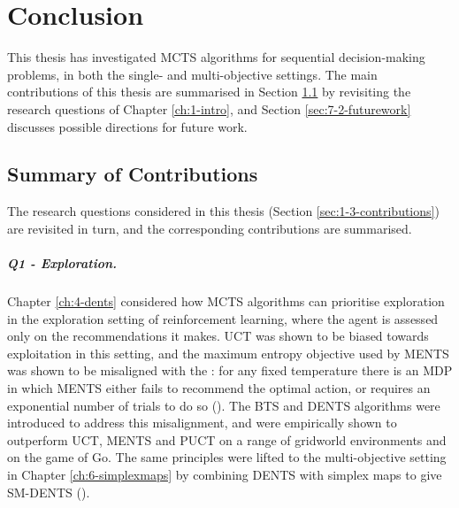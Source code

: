 

\chapter{\label{ch:7-conclusion}Conclusion} 

    \minitoc

    This thesis has investigated MCTS algorithms for sequential decision-making problems, in both the single- and multi-objective settings. The main contributions of this thesis are summarised in Section \ref{sec:7-1-contributions} by revisiting the research questions of Chapter \ref{ch:1-intro}, and Section \ref{sec:7-2-futurework} discusses possible directions for future work.



\section{Summary of Contributions}
\label{sec:7-1-contributions}

    The research questions considered in this thesis (Section \ref{sec:1-3-contributions}) are revisited in turn, and the corresponding contributions are summarised. 

    \paragraph{Q1 - Exploration.}
    Chapter \ref{ch:4-dents} considered how MCTS algorithms can prioritise exploration in the exploration setting of reinforcement learning, where the agent is assessed only on the recommendations it makes. UCT was shown to be biased towards exploitation in this setting, and the maximum entropy objective used by MENTS was shown to be misaligned with the : for any fixed temperature there is an MDP in which MENTS either fails to recommend the optimal action, or requires an exponential number of trials to do so (\entropyq). The BTS and DENTS algorithms were introduced to address this misalignment, and were empirically shown to outperform UCT, MENTS and PUCT on a range of gridworld environments and on the game of Go. The same principles were lifted to the multi-objective setting in Chapter \ref{ch:6-simplexmaps} by combining DENTS with simplex maps to give SM-DENTS (\contextq).


